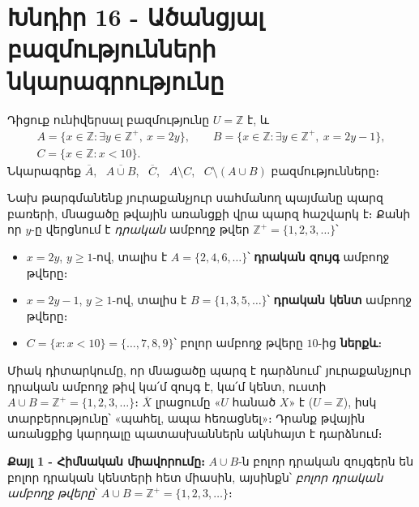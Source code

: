 \documentclass[11pt,a4paper]{article}
\newcommand{\Z}{\mathbb{Z}}
\begin{document}
\section*{Խնդիր 16 - Ածանցյալ բազմությունների նկարագրությունը}

\begin{problembox}[16]
Դիցուք ունիվերսալ բազմությունը $U=\Z$ է, և
\begin{gather*}
A=\{x\in\Z:\exists y\in\Z^{+},\ x=2y\},\qquad
  B=\{x\in\Z:\exists y\in\Z^{+},\ x=2y-1\},\\
  C=\{x\in\Z:x<10\}.
\end{gather*}
Նկարագրեք $\overline{A}$, \ $\overline{A\cup B}$, \ $\overline{C}$, \ $A\setminus C$, \
$C\setminus(A\cup B)$ բազմությունները։
\end{problembox}

\begin{ideabox}
Նախ թարգմանենք յուրաքանչյուր սահմանող պայմանը պարզ բառերի, մնացածը թվային առանցքի վրա պարզ հաշվարկ
է։ Քանի որ $y$-ը վերցնում է \emph{դրական} ամբողջ թվեր $\Z^{+}=\{1,2,3,\dots\}$՝
\begin{itemize}[leftmargin=1.2cm,topsep=2pt]
\item $x=2y$, $y\ge 1$-ով, տալիս է $A=\{2,4,6,\dots\}$՝ \textbf{դրական զույգ} ամբողջ թվերը։
\item $x=2y-1$, $y\ge 1$-ով, տալիս է $B=\{1,3,5,\dots\}$՝ \textbf{դրական կենտ} ամբողջ թվերը։
\item $C=\{x:x<10\}=\{\dots,7,8,9\}$՝ բոլոր ամբողջ թվերը $10$-ից \textbf{ներքև}։
\end{itemize}
Միակ դիտարկումը, որ մնացածը պարզ է դարձնում՝ յուրաքանչյուր դրական ամբողջ թիվ կա՛մ զույգ է, կա՛մ կենտ,
ուստի $A\cup B=\Z^{+}=\{1,2,3,\dots\}$։ $\overline{X}$ լրացումը «$U$ հանած $X$» է ($U=\Z$), իսկ
տարբերությունը՝ «պահել, ապա հեռացնել»։ Դրանք թվային առանցքից կարդալը պատասխաններն ակնհայտ է դարձնում։
\end{ideabox}

\textbf{Քայլ 1 - Հիմնական միավորումը։}
$A\cup B$-ն բոլոր դրական զույգերն են բոլոր դրական կենտերի հետ միասին, այսինքն՝ \emph{բոլոր դրական ամբողջ
թվերը}՝ $A\cup B=\Z^{+}=\{1,2,3,\dots\}$։
\end{document}
